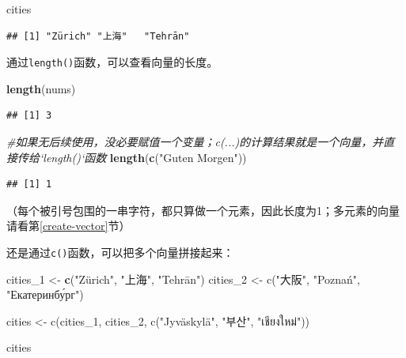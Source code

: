 \documentclass[]{book}
\newenvironment{Shaded}{\begin{snugshade}}{\end{snugshade}}
\newcommand{\CommentTok}[1]{\textcolor[rgb]{0.56,0.35,0.01}{\textit{#1}}}
\newcommand{\DecValTok}[1]{\textcolor[rgb]{0.00,0.00,0.81}{#1}}
\newcommand{\KeywordTok}[1]{\textcolor[rgb]{0.13,0.29,0.53}{\textbf{#1}}}
\newcommand{\NormalTok}[1]{#1}
\newcommand{\StringTok}[1]{\textcolor[rgb]{0.31,0.60,0.02}{#1}}
\begin{document}
\begin{Shaded}
\begin{Highlighting}[]
\NormalTok{cities}
\end{Highlighting}
\end{Shaded}

\begin{verbatim}
## [1] "Zürich" "上海"   "Tehrān"
\end{verbatim}

通过\texttt{length()}函数，可以查看向量的长度。

\begin{Shaded}
\begin{Highlighting}[]
\KeywordTok{length}\NormalTok{(nums)}
\end{Highlighting}
\end{Shaded}

\begin{verbatim}
## [1] 3
\end{verbatim}

\begin{Shaded}
\begin{Highlighting}[]
\CommentTok{#如果无后续使用，没必要赋值一个变量；c(...)的计算结果就是一个向量，并直接传给`length()`函数}
\KeywordTok{length}\NormalTok{(}\KeywordTok{c}\NormalTok{(}\StringTok{"Guten Morgen"}\NormalTok{)) }
\end{Highlighting}
\end{Shaded}

\begin{verbatim}
## [1] 1
\end{verbatim}

（每个被引号包围的一串字符，都只算做一个元素，因此长度为1；多元素的向量请看第\ref{create-vector}节）

还是通过\texttt{c()}函数，可以把多个向量拼接起来：

\begin{Shaded}
\begin{Highlighting}[]
\NormalTok{cities_}\DecValTok{1}\NormalTok{ <-}\StringTok{ }\KeywordTok{c}\NormalTok{(}\StringTok{"Zürich", "}\NormalTok{上海}\StringTok{", "}\NormalTok{Tehrān}\StringTok{")}
\StringTok{cities_2 <- c("}\NormalTok{大阪}\StringTok{", "}\NormalTok{Poznań}\StringTok{", "}\NormalTok{Екатеринбу́рг}\StringTok{")}

\StringTok{cities <- c(cities_1, cities_2, c("}\NormalTok{Jyväskylä}\StringTok{", "}\NormalTok{부산}\StringTok{", "}\NormalTok{เชียงใหม่}\StringTok{"))}

\StringTok{cities}
\end{Highlighting}
\end{Shaded}
\end{document}
